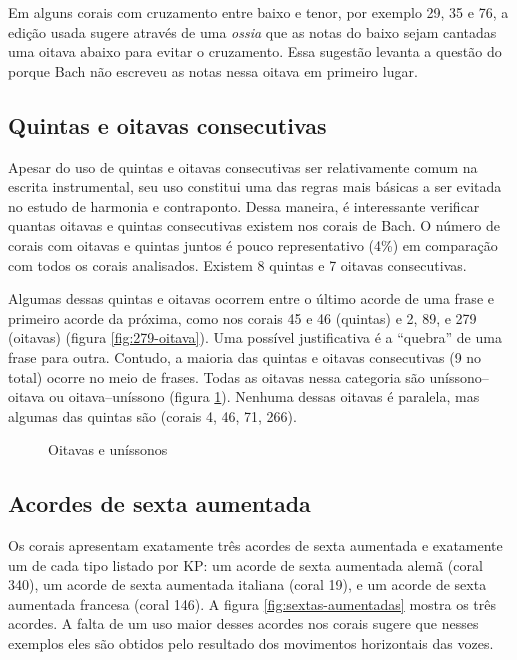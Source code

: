 Em alguns corais com cruzamento entre baixo e tenor, por exemplo 29,
35 e 76, a edição usada sugere através de uma \textit{ossia} que as
notas do baixo sejam cantadas uma oitava abaixo para evitar o
cruzamento. Essa sugestão levanta a questão do porque Bach não
escreveu as notas nessa oitava em primeiro lugar.

\subsection{Quintas e oitavas consecutivas}
\label{sec:quintas-e-oitavas}

Apesar do uso de quintas e oitavas consecutivas ser relativamente
comum na escrita instrumental, seu uso constitui uma das regras mais
básicas a ser evitada no estudo de harmonia e contraponto. Dessa
maneira, é interessante verificar quantas oitavas e quintas
consecutivas existem nos corais de Bach. O número de corais com
oitavas e quintas juntos é pouco representativo (4\%) em comparação
com todos os corais analisados. Existem 8 quintas e 7 oitavas
consecutivas.

Algumas dessas quintas e oitavas ocorrem entre o último acorde de uma
frase e primeiro acorde da próxima, como nos corais 45 e 46 (quintas)
e 2, 89, e 279 (oitavas) (figura \ref{fig:279-oitava}). Uma possível
justificativa é a ``quebra'' de uma frase para outra. Contudo, a
maioria das quintas e oitavas consecutivas (9 no total) ocorre no meio
de frases. Todas as oitavas nessa categoria são uníssono--oitava ou
oitava--uníssono (figura \ref{fig:oitavas-e-unissonos}). Nenhuma
dessas oitavas é paralela, mas algumas das quintas são (corais 4, 46,
71, 266).

\begin{figure}
  \centering
  \qquad
  \qquad
  \caption{Oitavas e uníssonos}
  \label{fig:oitavas-e-unissonos}
\end{figure}

\subsection{Acordes de sexta aumentada}
\label{sec:acordes-de-sexta}

Os corais apresentam exatamente três acordes de sexta aumentada e
exatamente um de cada tipo listado por KP: um acorde de sexta
aumentada alemã (coral 340), um acorde de sexta aumentada italiana
(coral 19), e um acorde de sexta aumentada francesa (coral 146). A
figura \ref{fig:sextas-aumentadas} mostra os três acordes. A falta de
um uso maior desses acordes nos corais sugere que nesses exemplos eles
são obtidos pelo resultado dos movimentos horizontais das vozes.

